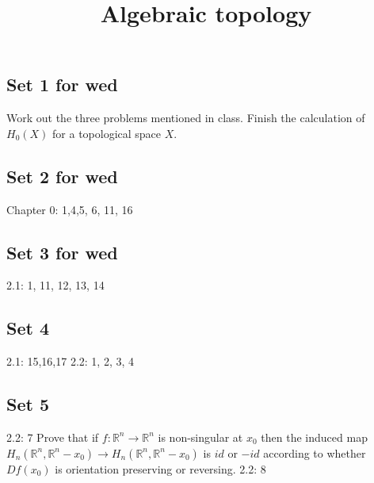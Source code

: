 \documentclass{amsart}
\numberwithin{equation}{section}
\theoremstyle{definition}
\theoremstyle{remark}
\begin{document}
\title{Algebraic topology}
\maketitle
\subsection{Set 1 for wed} 
Work out the three problems mentioned in class. Finish the
calculation of $H _{0} (X) $ for a topological space $X$. 
\subsection{Set 2 for wed}
Chapter 0: 1,4,5, 6, 11, 16 
\subsection{Set 3 for wed}
2.1: 1, 11, 12, 13, 14 
\subsection{Set 4}
2.1: 15,16,17
2.2: 1, 2, 3, 4
\subsection{Set 5}
2.2: 7
Prove that if $f: \mathbb{R} ^{n} \to \mathbb{R} ^{n} $ is
non-singular at $x _{0}$ then the induced map $H _{n}(\mathbb{R}
^{n}, \mathbb{R} ^{n} -x _{0}) \to H _{n}(\mathbb{R}
^{n}, \mathbb{R} ^{n} -x _{0})$ is $id$ or $-id$ according
to whether $Df (x _{0})$ is orientation preserving or
reversing.
2.2: 8
% 
% 
\end{document}
